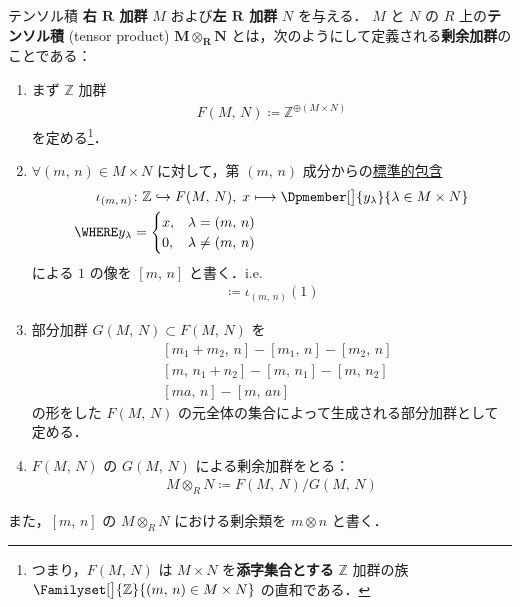 \documentclass[algtopo_main]{subfiles}
\begin{document}
\begin{mydef}[label=def:tensor,breakable]{テンソル積}
	\textbf{右 $\bm{R}$ 加群} $M$ および\textbf{左 $\bm{R}$ 加群} $N$ を与える．
	$M$ と $N$ の $R$ 上の\textbf{テンソル積} (tensor product) $\bm{M \otimes_{R} N}$ とは，次のようにして定義される\textbf{剰余加群}のことである：
	\begin{enumerate}
		\item まず $\mathbb{Z}$ 加群
		\begin{align}
			F(M,\, N) \coloneqq \mathbb{Z}^{\oplus (M \times N)}
		\end{align}
		を定める\footnote{つまり，$F(M,\, N)$ は $M \times N$ を\textbf{添字集合とする} $\mathbb{Z}$ 加群の族 $\Familyset[\big]{\mathbb{Z}}{(m,\, n) \in M \times N}$ の直和である．}．
		\item $\forall (m,\, n) \in M\times N$ に対して，第 $(m,\, n)$ 成分からの\hyperref[def:inj-proj]{標準的包含}
		\begin{align}
			\iota_{(m,\, n)} &\colon \mathbb{Z} \hookrightarrow F(M,\, N),\; x \lmto \Dpmember[\big]{y_{\lambda}}{\lambda \in M \times N} \\
			\WHERE y_{\lambda} &= 
			\begin{cases}
				x, & \lambda = (m,\, n) \\
				0, & \lambda \neq (m,\, n)
			\end{cases}
		\end{align}
		による $1$ の像を $[m,\, n]$ と書く．i.e.
		\begin{align}
			[m,\, n] \coloneqq \iota_{(m,\, n)}(1)
		\end{align}
		\item 部分加群 $G(M,\, N) \subset F(M,\, N)$ を
		\begin{align}
			&[m_1 + m_2,\, n] - [m_1,\, n] - [m_2,\, n] \\
			&[m,\, n_1 + n_2] - [m,\, n_1] - [m,\, n_2] \\
			&[ma,\, n] - [m,\, an]
		\end{align}
		の形をした $F(M,\, N)$ の元全体の集合によって生成される部分加群として定める．
		\item $F(M,\, N)$ の $G(M,\, N)$ による剰余加群をとる：
		\begin{align}
			M \otimes_R N \coloneqq F(M,\, N) / G(M,\, N)
		\end{align}
	\end{enumerate}
	また，$[m,\, n]$ の $M \otimes_R N$ における剰余類を $m\otimes n$ と書く．
\end{mydef}
\end{document}
